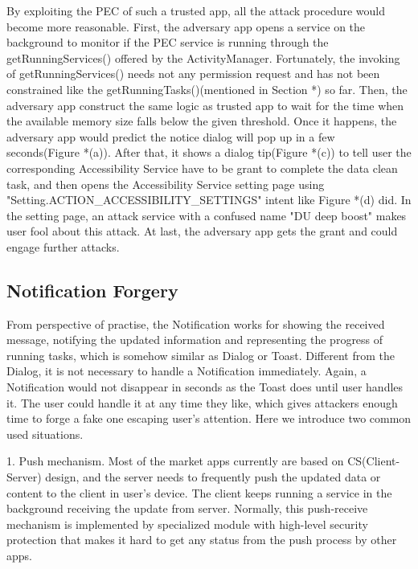 \documentclass{sig-alternate-05-2015}
\begin{document}
By exploiting the PEC of such a trusted app, all the attack procedure would become more reasonable. First, the adversary app opens a service on the background to monitor if the PEC service is running through the getRunningServices() offered by the ActivityManager. Fortunately, the invoking of getRunningServices() needs not any permission request and has not been constrained like the getRunningTasks()(mentioned in Section *) so far. Then, the adversary app construct the same logic as trusted app to wait for the time when the available memory size falls below the given threshold. Once it happens, the adversary app would predict the notice dialog will pop up in a few seconds(Figure *(a)). After that, it shows a dialog tip(Figure *(c)) to tell user the corresponding Accessibility Service have to be grant to complete the data clean task, and then opens the Accessibility Service setting page using "Setting.ACTION\_ACCESSIBILITY\_SETTINGS" intent like Figure *(d) did. In the setting page, an attack service with a confused name "DU deep boost" makes user fool about this attack. At last, the adversary app gets the grant and could engage further attacks. 


\subsection{Notification Forgery}
From perspective of practise, the Notification works for showing the received message, notifying the updated information and representing the progress of running tasks, which is somehow similar as Dialog or Toast. Different from the Dialog, it is not necessary to handle a Notification immediately. Again, a Notification would not disappear in seconds as the Toast does until user handles it. The user could handle it at any time they like, which gives attackers enough time to forge a fake one escaping user's attention. Here we introduce two common used situations. 

1. Push mechanism. Most of the market apps currently are based on CS(Client-Server) design, and the server needs to frequently push the updated data or content to the client in user's device. The client keeps running a service in the background receiving the update from server. Normally, this push-receive mechanism is implemented by specialized module with high-level security protection that makes it hard to get any status from the push process by other apps. 
\end{document}
